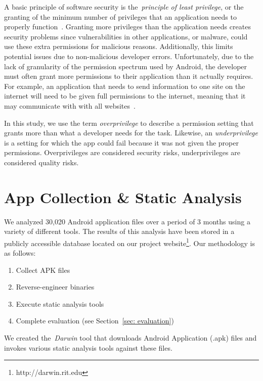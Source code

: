 \documentclass[conference]{IEEEtran}
\begin{document}
A basic principle of software security is the~\emph{principle of least privilege}, or the granting of the minimum number of privileges that an application needs to properly function~\cite{saltzer1975protection}. Granting more privileges than the application needs creates security problems since vulnerabilities in other applications, or malware, could use these extra permissions for malicious reasons. Additionally, this limits potential issues due to non-malicious developer errors. Unfortunately, due to the lack of granularity of the permission spectrum used by Android, the developer must often grant more permissions to their application than it actually requires. For example, an application that needs to send information to one site on the internet will need to be given full permissions to the internet, meaning that it may communicate with with all websites~\cite{jeon2011dr}.

In this study, we use the term \emph{overprivilege} to describe a permission setting that grants more than what a developer needs for the task. Likewise, an \emph{underprivilege} is a setting for which the app could fail because it was not given the proper permissions. Overprivileges are considered security risks, underprivileges are considered quality risks.

\label{sec: dca}
\section{App Collection \& Static Analysis}

We analyzed 30,020 Android application files over a period of 3 months using a variety of different tools. The results of this analysis have been stored in a publicly accessible database located on our project website\footnote{http://darwin.rit.edu}. Our methodology is as follows:

\begin{enumerate}
  \item Collect APK files
  \item Reverse-engineer binaries
  \item Execute static analysis tools
  \item Complete evaluation (see Section~\ref{sec: evaluation})
\end{enumerate}

We created the~\emph{Darwin} tool that downloads Android Application (.apk) files and invokes various static analysis tools against these files.

\label{sec: collection}
\end{document}
